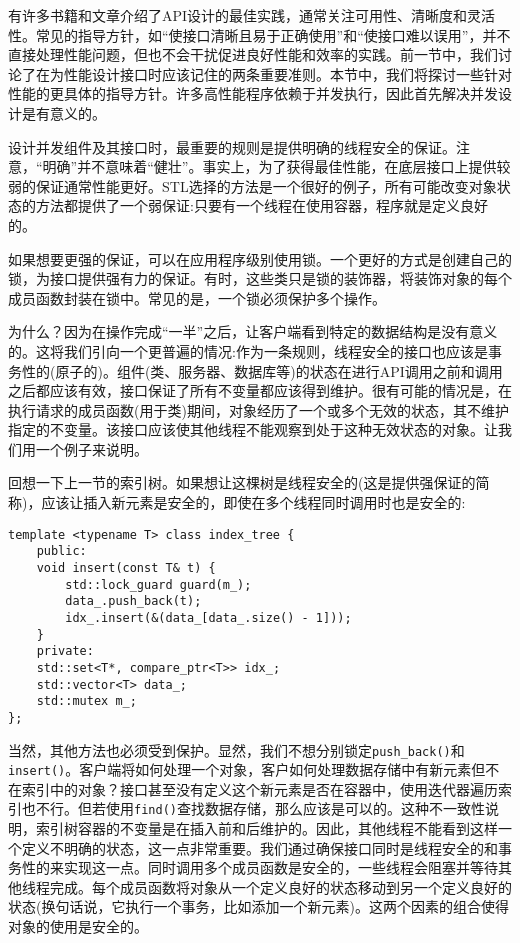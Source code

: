
有许多书籍和文章介绍了API设计的最佳实践，通常关注可用性、清晰度和灵活性。常见的指导方针，如“使接口清晰且易于正确使用”和“使接口难以误用”，并不直接处理性能问题，但也不会干扰促进良好性能和效率的实践。前一节中，我们讨论了在为性能设计接口时应该记住的两条重要准则。本节中，我们将探讨一些针对性能的更具体的指导方针。许多高性能程序依赖于并发执行，因此首先解决并发设计是有意义的。


设计并发组件及其接口时，最重要的规则是提供明确的线程安全的保证。注意，“明确”并不意味着“健壮”。事实上，为了获得最佳性能，在底层接口上提供较弱的保证通常性能更好。STL选择的方法是一个很好的例子，所有可能改变对象状态的方法都提供了一个弱保证:只要有一个线程在使用容器，程序就是定义良好的。 

如果想要更强的保证，可以在应用程序级别使用锁。一个更好的方式是创建自己的锁，为接口提供强有力的保证。有时，这些类只是锁的装饰器，将装饰对象的每个成员函数封装在锁中。常见的是，一个锁必须保护多个操作。

为什么？因为在操作完成“一半”之后，让客户端看到特定的数据结构是没有意义的。这将我们引向一个更普遍的情况:作为一条规则，线程安全的接口也应该是事务性的(原子的)。组件(类、服务器、数据库等)的状态在进行API调用之前和调用之后都应该有效，接口保证了所有不变量都应该得到维护。很有可能的情况是，在执行请求的成员函数(用于类)期间，对象经历了一个或多个无效的状态，其不维护指定的不变量。该接口应该使其他线程不能观察到处于这种无效状态的对象。让我们用一个例子来说明。

回想一下上一节的索引树。如果想让这棵树是线程安全的(这是提供强保证的简称)，应该让插入新元素是安全的，即使在多个线程同时调用时也是安全的:

\begin{lstlisting}[style=styleCXX]
template <typename T> class index_tree {
	public:
	void insert(const T& t) {
		std::lock_guard guard(m_);
		data_.push_back(t);
		idx_.insert(&(data_[data_.size() - 1]));
	}
	private:
	std::set<T*, compare_ptr<T>> idx_;
	std::vector<T> data_;
	std::mutex m_;
};

\end{lstlisting}

当然，其他方法也必须受到保护。显然，我们不想分别锁定\texttt{push\_back()}和\texttt{insert()}。客户端将如何处理一个对象，客户如何处理数据存储中有新元素但不在索引中的对象？接口甚至没有定义这个新元素是否在容器中，使用迭代器遍历索引也不行。但若使用\texttt{find()}查找数据存储，那么应该是可以的。这种不一致性说明，索引树容器的不变量是在插入前和后维护的。因此，其他线程不能看到这样一个定义不明确的状态，这一点非常重要。我们通过确保接口同时是线程安全的和事务性的来实现这一点。同时调用多个成员函数是安全的，一些线程会阻塞并等待其他线程完成。每个成员函数将对象从一个定义良好的状态移动到另一个定义良好的状态(换句话说，它执行一个事务，比如添加一个新元素)。这两个因素的组合使得对象的使用是安全的。


